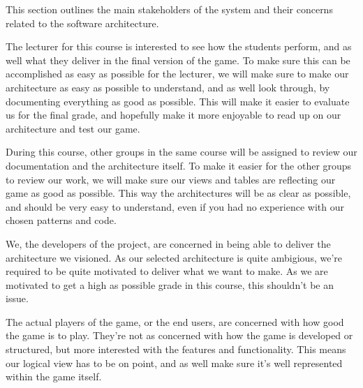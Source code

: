 This section outlines the main stakeholders of the system and their concerns related to the software architecture.

The lecturer for this course is interested to see how the students perform, and as well what they deliver in the final version of the game. To make sure this can be accomplished as easy as possible for the lecturer, we will make sure to make our architecture as easy as possible to understand, and as well look through, by documenting everything as good as possible. This will make it easier to evaluate us for the final grade, and hopefully make it more enjoyable to read up on our architecture and test our game.

During this course, other groups in the same course will be assigned to review our documentation and the architecture itself. To make it easier for the other groups to review our work, we will make sure our views and tables are reflecting our game as good as possible. This way the architectures will be as clear as possible, and should be very easy to understand, even if you had no experience with our chosen patterns and code.

We, the developers of the project, are concerned in being able to deliver the architecture we visioned. As our selected architecture is quite ambigious, we're required to be quite motivated to deliver what we want to make. As we are motivated to get a high as possible grade in this course, this shouldn't be an issue.

The actual players of the game, or the end users, are concerned with how good the game is to play. They're not as concerned with how the game is developed or structured, but more interested with the features and functionality. This means our logical view has to be on point, and as well make sure it's well represented within the game itself.
